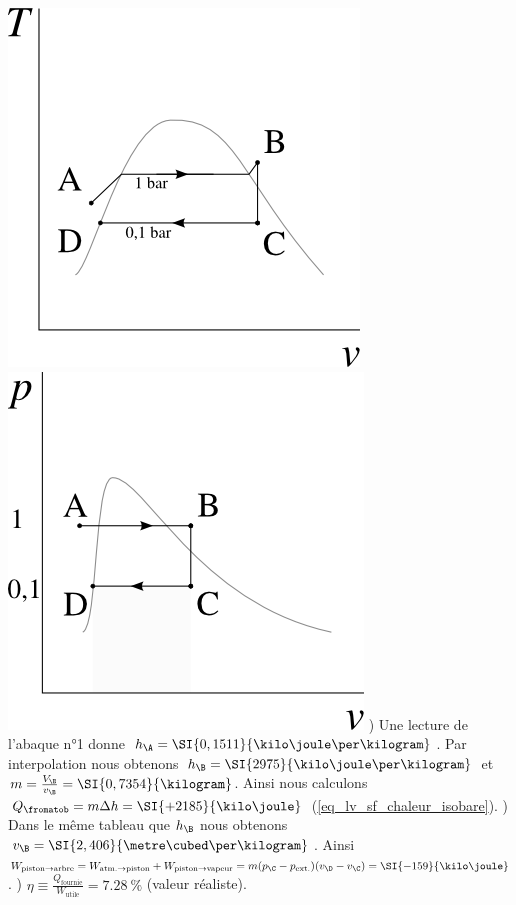\begin{description}
			\includegraphics[width=\solutiondiagramwidth]{images/ex_tv_newcomen.png} 
			\includegraphics[width=\solutiondiagramwidth]{images/ex_pv_newcomen.png}
			) Une lecture de l’abaque n°1 donne $h_\A = \SI{0,1511}{\kilo\joule\per\kilogram}$. Par interpolation nous obtenons $h_\B = \SI{2975}{\kilo\joule\per\kilogram}$ et $m = \frac{V_\B}{v_\B} = \SI{0,7354}{\kilogram}$. Ainsi nous calculons ${Q}_\fromatob = m \Delta h = \SI{+2185}{\kilo\joule}$ (\ref{eq_lv_sf_chaleur_isobare}).
			) Dans le même tableau que $h_\B$ nous obtenons $v_\B = \SI{2,406}{\metre\cubed\per\kilogram}$. Ainsi ${W}_{\text{piston} \to \text{arbre}} = W_{\text{atm.} \to \text{piston}} + W_{\text{piston} \to \text{vapeur}} = m (p_\C - p_\text{ext.}) (v_\D - v_\C) = \SI{-159}{\kilo\joule}$.
			) $\eta \equiv \frac{Q_\text{fournie}}{W_\text{utile}} = \SI{7,28}{\percent}$ (valeur réaliste).

\end{description}
